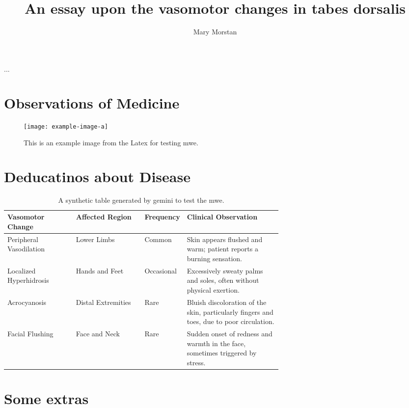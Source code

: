 \documentclass[jdecimal, citestyle=apa, 11pt]{maine-thesis}  %
\title{An essay upon the vasomotor changes in tabes dorsalis}					%
\author{Mary Morstan}					%
\begin{document}
\preliminary
\maketitle

\begin{abstract}
\Blindtext
\end{abstract}

\begin{layabstract}{...}	%
\blindtext
\end{layabstract}

\tableofcontents
\listoftables				%
\listoffigures				%

\mainmatter


\chapter{Observations of Medicine}
\blindtext
\begin{figure}[]
    \centering
    \texttt{[image: example-image-a]}
    \caption[Short Title for My Example Figure]{This is an example image from the Latex for testing mwe. \blindtext}
    \label{fig:example-a}
\end{figure}

\chapter{Deducatinos about Disease}
\blindtext
\begin{table}[h!]
    \centering
    \begin{tabularx}{\linewidth}{p{0.25\linewidth}p{0.25\linewidth}p{0.15\linewidth}X}
        \toprule
        \textbf{Vasomotor Change} & \textbf{Affected Region} & \textbf{Frequency} & \textbf{Clinical Observation} \\
        \midrule
        Peripheral Vasodilation & Lower Limbs & Common & Skin appears flushed and warm; patient reports a burning sensation. \\
        Localized Hyperhidrosis & Hands and Feet & Occasional & Excessively sweaty palms and soles, often without physical exertion. \\
        Acrocyanosis & Distal Extremities & Rare & Bluish discoloration of the skin, particularly fingers and toes, due to poor circulation. \\
        Facial Flushing & Face and Neck & Rare & Sudden onset of redness and warmth in the face, sometimes triggered by stress. \\
        \bottomrule
    \end{tabularx}
    \caption[Vasomotor Changes in Tabes Dorsalis]{A synthetic table generated by gemini to test the mwe.}
    \label{tab:vasomotor_changes2}
\end{table}

\appendix					%
\chapter{Some extras}
\blindtext
\end{document}
